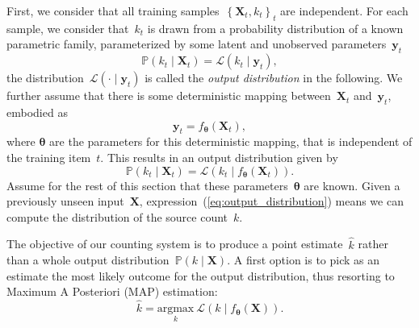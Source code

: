 First, we consider that all training samples~$\left\{\mathbf{X}_t,k_t\right\}_t$ are independent.
For each sample, we consider that~$k_t$ is drawn from a probability distribution of a known parametric family, parameterized by some latent and unobserved parameters~$\mathbf{y}_t$
\begin{equation}
\mathbb{P}\left(k_{t}\mid\mathbf{X}_{t}\right)=\mathcal{L}\left(k_{t}\mid \mathbf{y}_{t}\right),
\end{equation}
%
%
the distribution~$\mathcal{L}\left(\cdot\mid \mathbf{y}_{t}\right)$ is called the \textit{output distribution} in the following.
We further assume that there is some deterministic mapping between~$\mathbf{X}_t$ and~$\mathbf{y}_t$, embodied as
\begin{equation}
\mathbf{y}_{t}=f_{\mathbf{\theta}}\left(\mathbf{X}_{t}\right),
\end{equation}
where $\mathbf{\theta}$ are the parameters for this deterministic mapping, that is independent of the training item~$t$. This results in an output distribution given by
\begin{equation}
\mathbb{P}\left(k_{t}\mid\mathbf{X}_{t}\right)=\mathcal{L}\left(k_{t}\mid f_{\mathbf{\theta}}\left(\mathbf{X}_{t}\right)\right).\label{eq:output_distribution}
\end{equation}
Assume for the rest of this section that these parameters~$\mathbf{\theta}$ are known.
Given a previously unseen input~$\mathbf{X}$, expression~(\ref{eq:output_distribution}) means we can compute the distribution of the source count~$k$.

The objective of our counting system is to produce a point estimate~$\hat{k}$ rather than a whole output distribution~$\mathbb{P}\left(k\mid\mathbf{X}\right)$.
A first option is to pick as an estimate the most likely outcome for the output distribution, thus resorting to Maximum A Posteriori (MAP) estimation:
\begin{equation}
\hat{k}=\underset{k}{\text{argmax}}\ \mathcal{L}\left(k\mid f_{\mathbf{\theta}}\left(\mathbf{X}\right)\right).
\end{equation}

